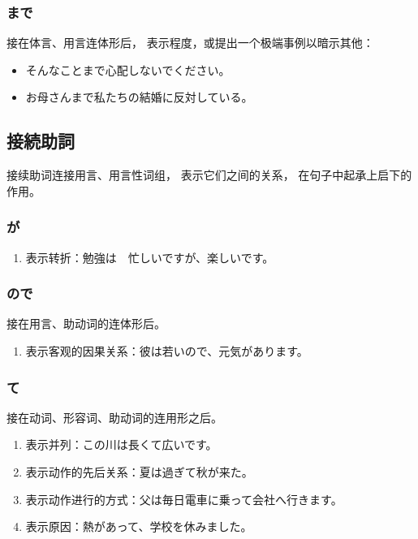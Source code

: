 \subsubsection{まで}%

接在体言、用言连体形后，
表示程度，或提出一个极端事例以暗示其他：
\begin{itemize}
  \item そんなことまで心配しないでください。
  \item お母さんまで私たちの結婚に反対している。
\end{itemize}


\subsection{接続助詞}%

接续助词连接用言、用言性词组，
表示它们之间的关系，
在句子中起承上启下的作用。


\subsubsection{が}%

\begin{enumerate}
  \item 表示转折：勉強は　忙しいですが、楽しいです。
\end{enumerate}


\subsubsection{ので}%

接在用言、助动词的连体形后。
\begin{enumerate}
  \item 表示客观的因果关系：彼は若いので、元気があります。
\end{enumerate}


\subsubsection{て}%

接在动词、形容词、助动词的连用形之后。
\begin{enumerate}
  \item 表示并列：この川は長くて広いです。
  \item 表示动作的先后关系：夏は過ぎて秋が来た。
  \item 表示动作进行的方式：父は毎日電車に乗って会社へ行きます。
  \item 表示原因：熱があって、学校を休みました。
\end{enumerate}


